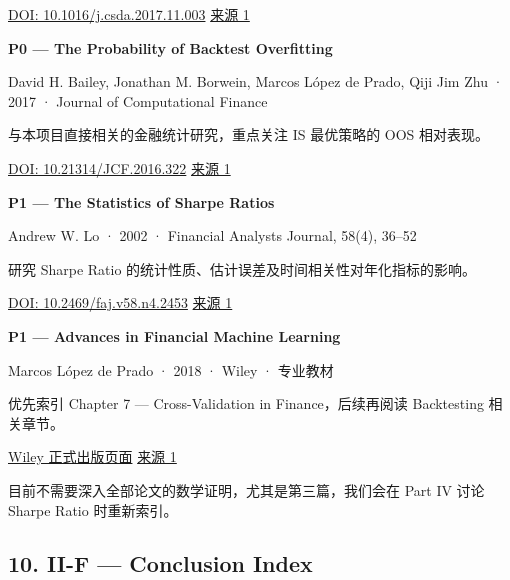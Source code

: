 \href{https://doi.org/10.1016/j.csda.2017.11.003}{DOI: 10.1016/j.csda.2017.11.003} \href{https://doi.org/10.1016\%2Fj.csda.2017.11.003}{来源 1}

\textbf{P0 --- The Probability of Backtest Overfitting}

David H. Bailey, Jonathan M. Borwein, Marcos López de Prado, Qiji Jim Zhu · 2017 · Journal of Computational Finance

与本项目直接相关的金融统计研究，重点关注 IS 最优策略的 OOS 相对表现。

\href{https://doi.org/10.21314/JCF.2016.322}{DOI: 10.21314/JCF.2016.322} \href{https://scholarworks.wmich.edu/math_pubs/42/}{来源 1}

\textbf{P1 --- The Statistics of Sharpe Ratios}

Andrew W. Lo · 2002 · Financial Analysts Journal, 58(4), 36--52

研究 Sharpe Ratio 的统计性质、估计误差及时间相关性对年化指标的影响。

\href{https://doi.org/10.2469/faj.v58.n4.2453}{DOI: 10.2469/faj.v58.n4.2453} \href{https://rpc.cfainstitute.org/research/financial-analysts-journal/2002/the-statistics-of-sharpe-ratios}{来源 1}

\textbf{P1 --- Advances in Financial Machine Learning}

Marcos López de Prado · 2018 · Wiley · 专业教材

优先索引 Chapter 7 --- Cross-Validation in Finance，后续再阅读 Backtesting 相关章节。

\href{https://www.wiley.com/en-us/Advances\%2Bin\%2BFinancial\%2BMachine\%2BLearning-p-9781119482086}{Wiley 正式出版页面} \href{https://www.wiley.com/en-us/Advances\%2Bin\%2BFinancial\%2BMachine\%2BLearning-p-9781119482086}{来源 1}

目前不需要深入全部论文的数学证明，尤其是第三篇，我们会在 Part IV 讨论 Sharpe Ratio 时重新索引。

\hypertarget{part-2-27-0001-ii-f-conclusion-index}{%
\subsection{10. II-F --- Conclusion Index}\label{part-2-27-0001-ii-f-conclusion-index}}


